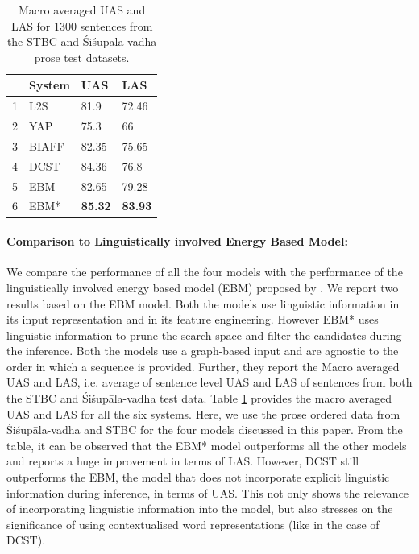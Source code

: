 \documentclass[11pt]{article}
\begin{document}
 \begin{table}
\centering
\begin{tabular}{|l|l|l|l|}
\hline

           & \textbf{System} & \textbf{UAS}   & \textbf{LAS}   \\ \hline
1          & L2S             & 81.9           & 72.46          \\ \hline
2          & YAP             & 75.3           & 66             \\ \hline
3          & BIAFF           & 82.35          & 75.65          \\ \hline
4          & DCST            & 84.36          & 76.8   
\\ \hline
5          & EBM            & 82.65          & 79.28   \\ \hline
6 & EBM*    & \textbf{85.32} & \textbf{83.93} \\ \hline
\end{tabular}
\caption{Macro averaged UAS and LAS for 1300 sentences from the STBC and Śiśupāla-vadha prose test datasets.}
\label{ebmComp}
\end{table} 
\paragraph{Comparison to Linguistically involved Energy Based Model:} We compare the performance of all the four models with the performance of the linguistically involved energy based model (EBM) proposed by . We report two results based on the EBM model. Both the models use linguistic information in its input representation and in its feature engineering. However EBM* uses linguistic information to prune the search space and filter the candidates during the  inference. Both the models use a graph-based input and are agnostic to the order in which a sequence is provided. Further, they report the Macro averaged UAS and LAS, i.e. average of sentence level UAS and LAS of sentences from both the STBC and Śiśupāla-vadha test data. Table \ref{ebmComp} provides the macro averaged UAS and LAS for all the six systems. Here, we use the prose ordered data from Śiśupāla-vadha and STBC for the four models discussed in this paper. From the table, it can be observed that the EBM* model outperforms all the other models and reports a huge improvement in terms of LAS. However, DCST still outperforms the EBM, the model that does not incorporate explicit linguistic information during inference, in terms of UAS. This not only shows the relevance of incorporating linguistic information into the model, but also stresses on the significance of using contextualised word representations (like in the case of DCST).    
\end{document}

